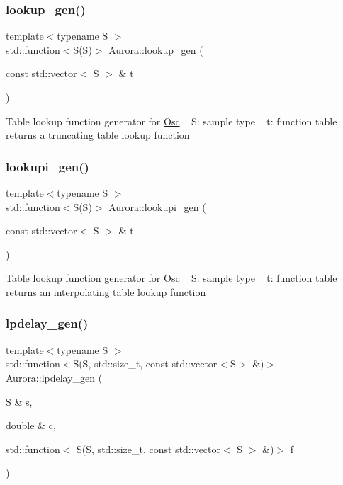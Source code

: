 \subsubsection{\texorpdfstring{lookup\+\_\+gen()}{lookup\_gen()}}
{\footnotesize\ttfamily template$<$typename S $>$ \\
std\+::function$<$S(S)$>$ Aurora\+::lookup\+\_\+gen (\begin{DoxyParamCaption}\item[{const std\+::vector$<$ S $>$ \&}]{t }\end{DoxyParamCaption})}

Table lookup function generator for \hyperlink{class_aurora_1_1_osc}{Osc} ~\newline
S\+: sample type ~\newline
t\+: function table ~\newline
returns a truncating table lookup function \mbox{\label{namespace_aurora_a043c55515e053a8d6f31ed7077a1bea6}} 
\subsubsection{\texorpdfstring{lookupi\+\_\+gen()}{lookupi\_gen()}}
{\footnotesize\ttfamily template$<$typename S $>$ \\
std\+::function$<$S(S)$>$ Aurora\+::lookupi\+\_\+gen (\begin{DoxyParamCaption}\item[{const std\+::vector$<$ S $>$ \&}]{t }\end{DoxyParamCaption})}

Table lookup function generator for \hyperlink{class_aurora_1_1_osc}{Osc} ~\newline
S\+: sample type ~\newline
t\+: function table ~\newline
returns an interpolating table lookup function \mbox{\label{namespace_aurora_a8a142312f627aaa19ba0e8a87f33d00b}} 
\subsubsection{\texorpdfstring{lpdelay\+\_\+gen()}{lpdelay\_gen()}}
{\footnotesize\ttfamily template$<$typename S $>$ \\
std\+::function$<$S(S, std\+::size\+\_\+t, const std\+::vector$<$S$>$ \&)$>$ Aurora\+::lpdelay\+\_\+gen (\begin{DoxyParamCaption}\item[{S \&}]{s,  }\item[{double \&}]{c,  }\item[{std\+::function$<$ S(S, std\+::size\+\_\+t, const std\+::vector$<$ S $>$ \&)$>$}]{f }\end{DoxyParamCaption})}

